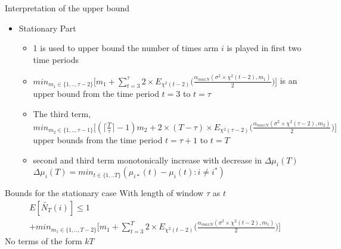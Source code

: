 \documentclass[compress, serif, onlymath, professionalfonts]{beamer}
\begin{document}
\begin{frame}{Interpretation of the upper bound}
\begin{itemize}
\item Stationary Part
\begin{itemize}
\item  1 is used to upper bound the number of times arm $i$ is played in first two time periods
\item  $
min_{m_1 \in \{1,..,\tau-2\}}\big[m_1+ \sum_{t=3}^{\tau}2\times E_{\chi^2(t-2)}\big(\frac{\alpha_{maxN}(\sigma^2\times\chi^2(t-2),m_1)}{2}\big)\big]
$
is an upper bound  from the time period $t=3$ to $t=\tau$
\item The third term,
$
 min_{m_2 \in \{1,..,\tau-1\}}\big[( \lceil{\frac{T}{\tau}}\rceil-1)m_2
+2\times(T-\tau)\times E_{\chi^2(\tau-2)}\big(\frac{\alpha_{maxN}(\sigma^2\times\chi^2(\tau-2),m_2)}{2}\big)\big]
$
upper bounds  from the time period $t=\tau+1$ to $t=T$ 
\item second and third term monotonically increase with decrease in $\Delta \mu_i(T)$ \\
$\Delta \mu_i(T)=min_{t \in \{1,..T\}}(\mu_{i*}(t)-\mu_i(t):i \neq i^*)$
\end{itemize}
\end{itemize}
\end{frame}

\begin{frame}{Bounds for the stationary case}
With length of window $\tau$ as $t$
\begin{multline*}
E[\tilde{N_T}(i)] \leq 1\\+min_{m_1 \in \{1,..,T-2\}}\big[m_1+\sum_{t=3}^{T}2\times E_{\chi^2(t-2)}\big(\frac{\alpha_{maxN}(\sigma^2\times\chi^2(t-2),m_1)}{2}\big)\big]
\end{multline*}
No terms of the form $kT$
\end{frame}
\end{document}
